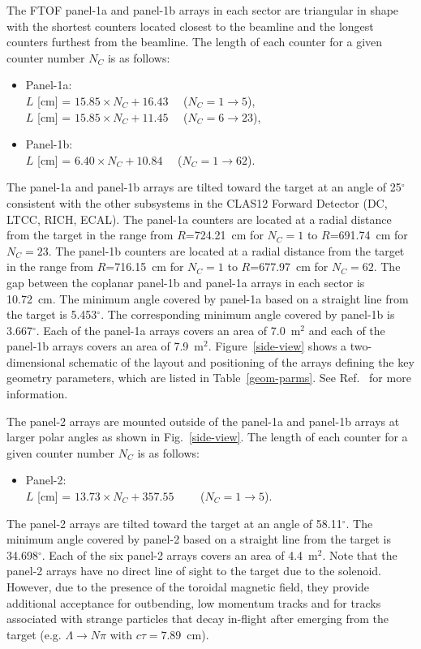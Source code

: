 \documentclass[3p,times,twocolumn]{elsarticle}
\begin{document}
The FTOF panel-1a and panel-1b arrays in each sector are triangular in shape with the shortest counters
located closest to the beamline and the longest counters furthest from the beamline. The length of each
counter for a given counter number $N_C$ is as follows:

\begin{itemize}
\item Panel-1a: \\
  $L$ [cm] = $15.85 \times N_C + 16.43$ ~~($N_C = 1 \to 5$), \\
  $L$ [cm] = $15.85 \times N_C + 11.45$ ~~($N_C = 6 \to 23$), 
\item Panel-1b: \\
  $L$ [cm] = $6.40 \times N_C + 10.84$ ~~($N_C = 1 \to 62$).
\end{itemize}

The panel-1a and panel-1b arrays are tilted toward the target at an angle of 25$^{\circ}$ consistent with
the other subsystems in the CLAS12 Forward Detector (DC, LTCC, RICH, ECAL). The panel-1a counters
are located at a radial distance from the target in the range from $R$=724.21~cm for $N_C = 1$ to
$R$=691.74~cm for $N_C = 23$. The panel-1b counters are located at a radial distance from the target
in the range from $R$=716.15~cm for $N_C = 1$ to $R$=677.97~cm for $N_C = 62$. The gap between the
coplanar panel-1b and panel-1a arrays in each sector is 10.72~cm. The minimum angle covered by panel-1a
based on a straight line from the target is 5.453$^\circ$. The corresponding minimum angle covered by
panel-1b is 3.667$^\circ$. Each of the panel-1a arrays covers an area of 7.0~m$^2$ and each of the
panel-1b arrays covers an area of 7.9~m$^2$. Figure~\ref{side-view} shows a two-dimensional schematic
of the layout and positioning of the arrays defining the key geometry parameters, which are listed in
Table~\ref{geom-parms}. See Ref.~\cite{ftof-geom} for more information.

The panel-2 arrays are mounted outside of the panel-1a and panel-1b arrays at larger polar angles as shown
in Fig.~\ref{side-view}. The length of each counter for a given counter number $N_C$ is as follows:

\begin{itemize}
\item Panel-2: \\
  $L$ [cm] = $13.73 \times N_C + 357.55$~~ ~~($N_C = 1 \to 5$).
\end{itemize}

The panel-2 arrays are tilted toward the target at an angle of 58.11$^\circ$. The minimum angle covered
by panel-2 based on a straight line from the target is 34.698$^\circ$. Each of the six panel-2 arrays covers
an area of 4.4~m$^2$. Note that the panel-2 arrays have no direct line of sight to the target due to the
solenoid. However, due to the presence of the toroidal magnetic field, they provide additional acceptance for
outbending, low momentum tracks  and for tracks associated with strange particles that decay in-flight after
emerging from the target (e.g. $\Lambda \to N \pi$ with $c \tau = 7.89$~cm).
\end{document}
